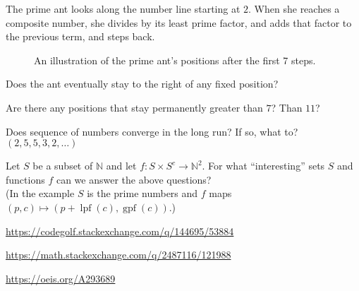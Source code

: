 \documentclass{article}
\begin{document}
The prime ant looks along the number line starting at $2$. When she reaches a
composite number, she divides by its least prime factor, and adds that factor to
the previous term, and steps back.

\begin{figure}[!h]
  \centering
  \caption{An illustration of the prime ant's positions after the first 7 steps.}
\end{figure}

\begin{question}
  Does the ant eventually stay to the right of any fixed position?
\end{question}
\begin{related}
  \item Are there any positions that stay permanently greater than $7$? Than $11$?
  \item Does sequence of numbers converge in the long run? If so, what to?
    $(2, 5, 5, 3, 2, \hdots)$
  \item Let $S$ be a subset of $\mathbb{N}$ and let
    $f: S\times S^{c} \rightarrow \mathbb{N}^2$.
    For what ``interesting'' sets $S$ and functions $f$ can we answer the above
    questions?\\
    (In the example $S$ is the prime numbers and $f$ maps
    $(p, c) \mapsto (p + \operatorname{lpf}(c), \operatorname{gpf}(c))$.)
\end{related}
\begin{references}
  \item \url{https://codegolf.stackexchange.com/q/144695/53884}
  \item \url{https://math.stackexchange.com/q/2487116/121988}
  \item \url{https://oeis.org/A293689}
\end{references}
\end{document}
